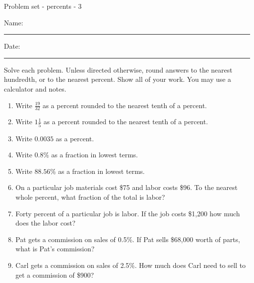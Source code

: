 \documentclass[12pt]{article}
\begin{document}
\pagestyle{empty} %
\begin{center}
          Problem set - percents - 3 \\[0.5in]
\end{center}
Name: \rule{4in}{0.005in} Date: \rule{1.5in}{0.005in} 
  \vspace{0.25in}

Solve each problem. Unless directed otherwise, round answers to the nearest hundredth, or to the nearest percent. Show all of your work. You may use a calculator and notes. 
\begin{enumerate}
\item Write $\frac{19}{32}$ as a percent rounded to the nearest tenth of a percent. 
	\vspace{0.260in}

\item Write $1\frac{1}{5}$ as a percent rounded to the nearest tenth of a percent. 
	\vspace{0.260in}

\item Write $0.0035$ as a percent.
	\vspace{0.260in}

\item Write $0.8\%$ as a fraction in lowest terms.
	\vspace{0.260in}

\item Write $88.56\%$ as a fraction in lowest terms.
	\vspace{0.260in}

\item On a particular job materials cost \$75 and labor costs \$96. To the nearest whole percent, what fraction of the total is labor?
	\vspace{0.280in}

\item Forty percent of a particular job is labor. If the job costs \$1,200 how much does the labor cost?
	\vspace{0.280in}

\item Pat gets a commission on sales of 0.5\%. If Pat sells \$68,000 worth of parts, what is Pat's commission? 
	\vspace{0.280in}

\item Carl gets a commission on sales of 2.5\%. How much does Carl need to sell to get a commission of \$900?
	\vspace{0.280in}


\end{enumerate}
\end{document}
